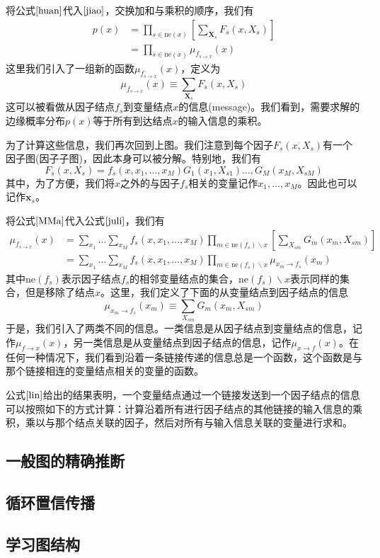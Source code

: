 将公式$\ref{huan}$代入$\ref{jiao}$，交换加和与乘积的顺序，我们有
\begin{equation}
	\begin{aligned}
		p(x)&=\prod_{s\in \mathrm{ne}(x)}\left[\sum_{\boldsymbol{X}_s}F_s(x,X_s) \right]\\
		&=\prod_{s\in \mathrm{ne}(x)}\mu_{f_{s\to x}}(x)
	\end{aligned}
\end{equation}
这里我们引入了一组新的函数$\mu_{f_{s\to x}}(x)$，定义为
\begin{equation}
\label{juli}
	\mu_{f_{s\to x}}(x)\equiv \sum_{\boldsymbol{X}_s}F_s(x,X_s)
\end{equation}
这可以被看做从因子结点$f_s$到变量结点$x$的信息(message)。我们看到，需要求解的边缘概率分布$p(x)$等于所有到达结点$x$的输入信息的乘积。

为了计算这些信息，我们再次回到上图。我们注意到每个因子$F_s(x,X_s)$有一个因子图(因子子图)，因此本身可以被分解。特别地，我们有
\begin{equation}
\label{MMa}
	F_s(x,X_s)=f_s(x,x_1,\dots,x_M)G_1(x_1,X_{s1})\dots,G_M(x_M,X_{sM})
\end{equation}
其中，为了方便，我们将$x$之外的与因子$f_s$相关的变量记作$x_1,\dots,x_M$。因此也可以记作$\boldsymbol{x}_s$。

将公式$\ref{MMa}$代入公式$\ref{juli}$，我们有
\begin{equation}
\label{lin}
	\begin{aligned}
	\mu_{f_{s\to x}}(x)&=\sum_{x_1}\dots\sum_{x_M}f_s(x,x_1,\dots,x_M)\prod_{m\in \mathrm{ne}(f_s)\backslash x}\left[\sum_{X_{sm}}G_m(x_m,X_{sm}) \right]\\
	&=\sum_{x_1}\dots\sum_{x_M}f_s(x,x_1,\dots,x_M)\prod_{m\in \mathrm{ne}(f_s)\backslash x}\mu_{x_{m}\to f_s}(x_m)
	\end{aligned}
\end{equation}
其中$\mathrm{ne}(f_s)$表示因子结点$f_s$的相邻变量结点的集合，$\mathrm{ne}(f_s)\backslash x$表示同样的集合，但是移除了结点$x$。这里，我们定义了下面的从变量结点到因子结点的信息
\begin{equation}
	\mu_{x_{m}\to f_s}(x_m)\equiv \sum_{X_{sm}}G_m(x_m,X_{sm})
\end{equation}
于是，我们引入了两类不同的信息。一类信息是从因子结点到变量结点的信息，记作$\mu_{f\to x}(x)$，另一类信息是从变量结点到因子结点的信息，记作$\mu_{x\to f}(x)$。在任何一种情况下，我们看到沿着一条链接传递的信息总是一个函数，这个函数是与那个链接相连的变量结点相关的变量的函数。

公式$\ref{lin}$给出的结果表明，一个变量结点通过一个链接发送到一个因子结点的信息可以按照如下的方式计算：计算沿着所有进行因子结点的其他链接的输入信息的乘积，乘以与那个结点关联的因子，然后对所有与输入信息关联的变量进行求和。
\subsection*{一般图的精确推断}
\subsection*{循环置信传播}
\subsection*{学习图结构}